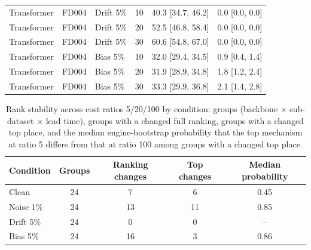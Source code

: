 \documentclass[10pt,a4paper]{article}
\begin{document}
\begin{center}
\begin{longtable}{lllcll}
Transformer & FD004 & Drift 5\% & 10 & 40.3 [34.7, 46.2] & 0.0 [0.0, 0.0]  \\
Transformer & FD004 & Drift 5\% & 20 & 52.5 [46.8, 58.4] & 0.0 [0.0, 0.0]  \\
Transformer & FD004 & Drift 5\% & 30 & 60.6 [54.8, 67.0] & 0.0 [0.0, 0.0]  \\
Transformer & FD004 & Bias 5\% & 10 & 32.0 [29.4, 34.5] & 0.9 [0.4, 1.4]  \\
Transformer & FD004 & Bias 5\% & 20 & 31.9 [28.9, 34.8] & 1.8 [1.2, 2.4]  \\
Transformer & FD004 & Bias 5\% & 30 & 33.3 [29.9, 36.8] & 2.1 [1.4, 2.8]  \\
\bottomrule
\end{longtable}
\end{center}
\begin{table}[H]\centering\footnotesize
\caption{Rank stability across cost ratios 5/20/100 by condition: groups (backbone $\times$ sub-dataset $\times$ lead time), groups with a changed full ranking, groups with a changed top place, and the median engine-bootstrap probability that the top mechanism at ratio 5 differs from that at ratio 100 among groups with a changed top place.}
\begin{tabular}{lcccc}\toprule
Condition & Groups & Ranking changes & Top changes & Median probability \\ \midrule
Clean & 24 & 7 & 6 & 0.45 \\
Noise 1\% & 24 & 13 & 11 & 0.85 \\
Drift 5\% & 24 & 0 & 0 & -- \\
Bias 5\% & 24 & 16 & 3 & 0.86 \\
\bottomrule\end{tabular}
\end{table}
\end{document}
